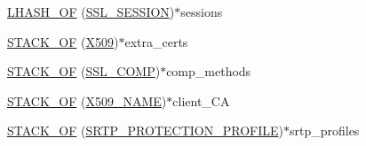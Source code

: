 \begin{DoxyCompactItemize}
\item 
\hyperlink{structssl__ctx__st_a7cf6ac5c7e612eb562aa2a1a52f5cba3}{L\+H\+A\+S\+H\+\_\+\+OF} (\hyperlink{include_2openssl_2ssl_8h_a8dd6b81bbcb1b2d769235c37779d2a94}{S\+S\+L\+\_\+\+S\+E\+S\+S\+I\+ON})$\ast$sessions
\item 
\hyperlink{structssl__ctx__st_ab41dc9c0f4a22bfac48c06031a355326}{S\+T\+A\+C\+K\+\_\+\+OF} (\hyperlink{crypto_2ossl__typ_8h_a4f666bde6518f95deb3050c54b408416}{X509})$\ast$extra\+\_\+certs
\item 
\hyperlink{structssl__ctx__st_a8207792c72033c18fe3bc519ecbb475a}{S\+T\+A\+C\+K\+\_\+\+OF} (\hyperlink{include_2openssl_2ssl_8h_a4cd5a344b1a968bf05804c52899f21fe}{S\+S\+L\+\_\+\+C\+O\+MP})$\ast$comp\+\_\+methods
\item 
\hyperlink{structssl__ctx__st_a585acf1ac07e11f87fd62186eddd44bf}{S\+T\+A\+C\+K\+\_\+\+OF} (\hyperlink{crypto_2ossl__typ_8h_a5c5fc036757e87b9bd163d0221696533}{X509\+\_\+\+N\+A\+ME})$\ast$client\+\_\+\+CA
\item 
\hyperlink{structssl__ctx__st_adea4ce87fc8b96145c1f17a50805b9d7}{S\+T\+A\+C\+K\+\_\+\+OF} (\hyperlink{include_2openssl_2ssl_8h_ad71374b5a3df5292d0722b703841292e}{S\+R\+T\+P\+\_\+\+P\+R\+O\+T\+E\+C\+T\+I\+O\+N\+\_\+\+P\+R\+O\+F\+I\+LE})$\ast$srtp\+\_\+profiles
\end{DoxyCompactItemize}
